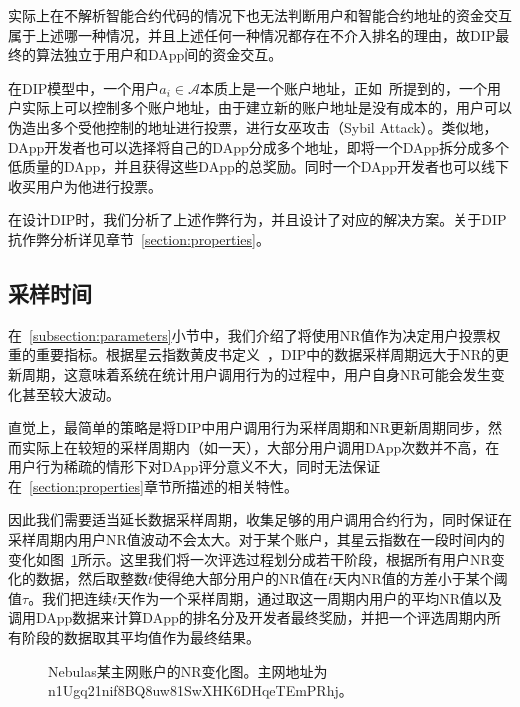 实际上在不解析智能合约代码的情况下也无法判断用户和智能合约地址的资金交互属于上述哪一种情况，并且上述任何一种情况都存在不介入排名的理由，故DIP最终的算法独立于用户和DApp间的资金交互。

在DIP模型中，一个用户$a_i \in \mathcal{A}$本质上是一个账户地址，正如~\cite{Nebulasyellowpaper}所提到的，一个用户实际上可以控制多个账户地址，由于建立新的账户地址是没有成本的，用户可以伪造出多个受他控制的地址进行投票，进行女巫攻击（Sybil Attack）。类似地，DApp开发者也可以选择将自己的DApp分成多个地址，即将一个DApp拆分成多个低质量的DApp，并且获得这些DApp的总奖励。同时一个DApp开发者也可以线下收买用户为他进行投票。

在设计DIP时，我们分析了上述作弊行为，并且设计了对应的解决方案。关于DIP抗作弊分析详见章节~\ref{section:properties}。



\subsection{采样时间}
\label{subsection:interval}

在~\ref{subsection:parameters}小节中，我们介绍了将使用NR值作为决定用户投票权重的重要指标。根据星云指数黄皮书定义~\cite{Nebulasyellowpaper}，DIP中的数据采样周期远大于NR的更新周期，这意味着系统在统计用户调用行为的过程中，用户自身NR可能会发生变化甚至较大波动。

直觉上，最简单的策略是将DIP中用户调用行为采样周期和NR更新周期同步，然而实际上在较短的采样周期内（如一天），大部分用户调用DApp次数并不高，在用户行为稀疏的情形下对DApp评分意义不大，同时无法保证在~\ref{section:properties}章节所描述的相关特性。

因此我们需要适当延长数据采样周期，收集足够的用户调用合约行为，同时保证在采样周期内用户NR值波动不会太大。对于某个账户，其星云指数在一段时间内的变化如图~\ref{fig:nr}所示。这里我们将一次评选过程划分成若干阶段，根据所有用户NR变化的数据，然后取整数$t$使得绝大部分用户的NR值在$t$天内NR值的方差小于某个阈值$\tau$。我们把连续$t$天作为一个采样周期，通过取这一周期内用户的平均NR值以及调用DApp数据来计算DApp的排名分及开发者最终奖励，并把一个评选周期内所有阶段的数据取其平均值作为最终结果。%


\begin{figure}
\label{fig:nr}
  \centering
  
  \caption{Nebulas某主网账户的NR变化图。主网地址为n1Ugq21nif8BQ8uw81SwXHK6DHqeTEmPRhj。}
\end{figure}
